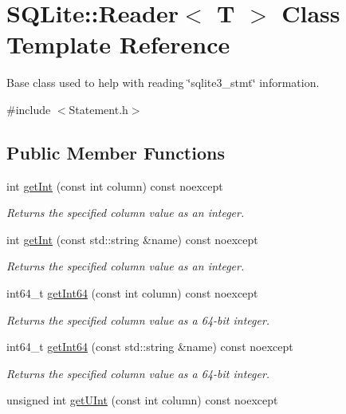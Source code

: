 \hypertarget{a00010}{\section{S\-Q\-Lite\-:\-:Reader$<$ T $>$ Class Template Reference}
\label{a00010}
}


Base class used to help with reading \char`\"{}sqlite3\-\_\-stmt\char`\"{} information.  




{\ttfamily \#include $<$Statement.\-h$>$}

\subsection*{Public Member Functions}
\begin{DoxyCompactItemize}
\item 
int \hyperlink{a00010_a82c5bc45048b8328a2fcc9bb4ff975f2}{get\-Int} (const int column) const noexcept
\begin{DoxyCompactList}\small\item\em Returns the specified column value as an integer. \end{DoxyCompactList}\item 
int \hyperlink{a00010_a87dd8234c2bd5f19466813f8a68ab80a}{get\-Int} (const std\-::string \&name) const noexcept
\begin{DoxyCompactList}\small\item\em Returns the specified column value as an integer. \end{DoxyCompactList}\item 
int64\-\_\-t \hyperlink{a00010_adb7b9705a4638d6d5af5ca26dfa474ff}{get\-Int64} (const int column) const noexcept
\begin{DoxyCompactList}\small\item\em Returns the specified column value as a 64-\/bit integer. \end{DoxyCompactList}\item 
int64\-\_\-t \hyperlink{a00010_aea6d24bb9247bfc52fe77d62be961dd2}{get\-Int64} (const std\-::string \&name) const noexcept
\begin{DoxyCompactList}\small\item\em Returns the specified column value as a 64-\/bit integer. \end{DoxyCompactList}\item 
unsigned int \hyperlink{a00010_a971fb706b9215a89532ac48640f94832}{get\-U\-Int} (const int column) const noexcept

\end{DoxyCompactItemize}
